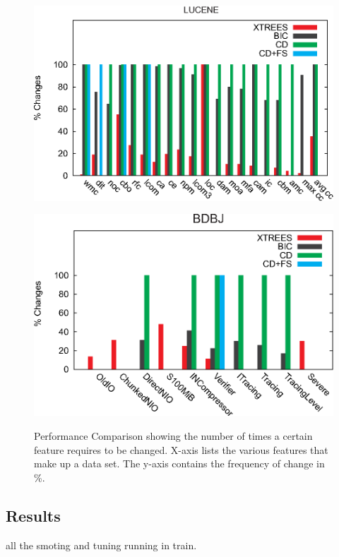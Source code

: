 \documentclass{sig-alternate}
\begin{document}
\begin{figure}[t]
\begin{minipage}{0.5\textwidth}
\includegraphics[width=0.9\linewidth]{_figs/Deltas-Lucene.eps}
\label{fig:delta_ivy}
\end{minipage}
\begin{minipage}{0.5\textwidth}
\includegraphics[width=0.9\linewidth]{_figs/Deltas-BDBJ.eps}
\label{fig:delta_apache}
\end{minipage}
\caption{Performance Comparison showing the number of times a certain feature requires to be changed. X-axis lists the various features that make up a data set. The y-axis contains the frequency of change in \%.}
\end{figure}
 

 

\subsection{Results}

all the smoting and tuning running in train.
\end{document}
